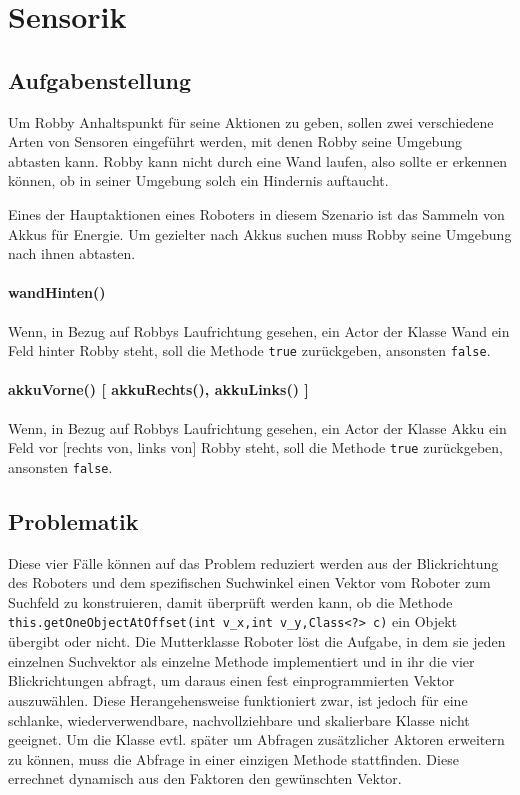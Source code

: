 \section{Sensorik}

\subsection{Aufgabenstellung}
\label{snsk:aufgabe}
Um Robby Anhaltspunkt für seine Aktionen zu geben, sollen zwei verschiedene Arten von Sensoren eingeführt werden, mit denen Robby seine Umgebung abtasten kann. Robby kann nicht durch eine Wand laufen, also sollte er erkennen können, ob in seiner Umgebung solch ein Hindernis auftaucht.

Eines der Hauptaktionen eines Roboters in diesem Szenario ist das Sammeln von Akkus für Energie. Um gezielter nach Akkus suchen muss Robby seine Umgebung nach ihnen abtasten.

\paragraph{wandHinten()}
Wenn, in Bezug auf Robbys Laufrichtung gesehen, ein Actor der Klasse Wand ein Feld hinter Robby steht, soll die Methode \texttt{true} zurückgeben, ansonsten \texttt{false}.

\paragraph{akkuVorne() [ akkuRechts(), akkuLinks() ]}
Wenn, in Bezug auf Robbys Laufrichtung gesehen, ein Actor der Klasse Akku ein Feld vor [rechts von, links von] Robby steht, soll die Methode \texttt{true} zurückgeben, ansonsten \texttt{false}.

\subsection{Problematik}
\label{snsk:problem}
Diese vier Fälle können auf das Problem reduziert werden aus der Blickrichtung des Roboters und dem spezifischen Suchwinkel einen Vektor vom Roboter zum Suchfeld zu konstruieren, damit überprüft werden kann, ob die Methode \texttt{this.getOneObjectAtOffset(int v_x,int v_y,Class<?> c)} ein Objekt übergibt oder nicht.
Die Mutterklasse Roboter löst die Aufgabe, in dem sie jeden einzelnen Suchvektor als einzelne Methode implementiert und in ihr die vier Blickrichtungen abfragt, um daraus einen fest einprogrammierten Vektor auszuwählen.
Diese Herangehensweise funktioniert zwar, ist jedoch für eine schlanke, wiederverwendbare, nachvollziehbare und skalierbare Klasse nicht geeignet.
Um die Klasse evtl. später um Abfragen zusätzlicher Aktoren erweitern zu können, muss die Abfrage in einer einzigen Methode stattfinden. Diese errechnet dynamisch aus den Faktoren den gewünschten Vektor.

